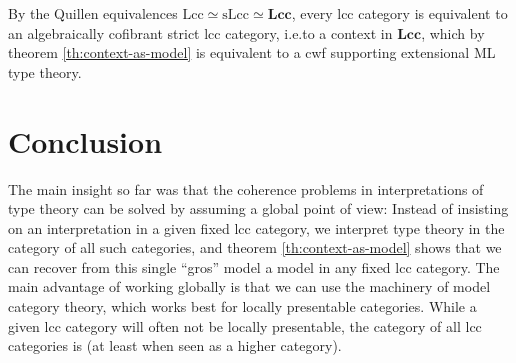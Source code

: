 \documentclass{article}
\begin{document}
By the Quillen equivalences $\mathrm{Lcc} \simeq \mathrm{sLcc} \simeq \mathbf{Lcc}$, every lcc category is equivalent to an algebraically cofibrant strict lcc category, i.e.\@ to a context in $\mathbf{Lcc}$, which by theorem \ref{th:context-as-model} is equivalent to a cwf supporting extensional ML type theory.

\section{Conclusion}

The main insight so far was that the coherence problems in interpretations of type theory can be solved by assuming a global point of view:
Instead of insisting on an interpretation in a given fixed lcc category, we interpret type theory in the category of all such categories, and theorem \ref{th:context-as-model} shows that we can recover from this single ``gros'' model a model in any fixed lcc category.
The main advantage of working globally is that we can use the machinery of model category theory, which works best for locally presentable categories.
While a given lcc category will often not be locally presentable, the category of all lcc categories is (at least when seen as a higher category).




\end{document}

